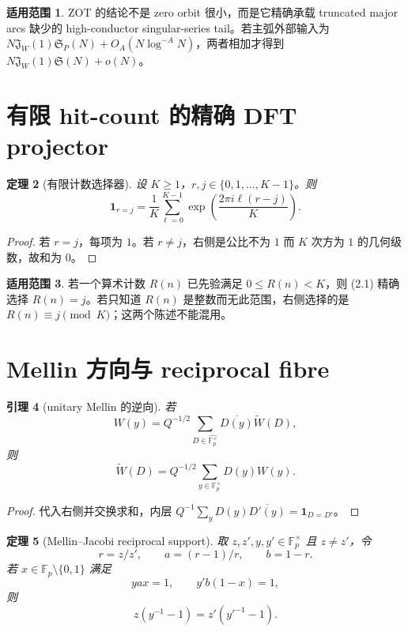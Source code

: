 \documentclass[11pt,a4paper]{ctexart}
\newtheorem{theorem}{定理}[section]
\newtheorem{lemma}[theorem]{引理}
\theoremstyle{definition}
\newtheorem{remark}[theorem]{适用范围}
\newcommand{\F}{\mathbb F}
\newcommand{\G}{\F_p^\times}
\newcommand{\Gh}{\widehat{\G}}
\newcommand{\1}{\mathbf 1}
\begin{document}
\begin{remark}
ZOT 的结论不是 zero orbit 很小，而是它精确承载 truncated major arcs 缺少的
high-conductor singular-series tail。若主弧外部输入为
$N\mathfrak J_W(1)\mathfrak S_P(N)+O_A(N\log^{-A}N)$，两者相加才得到
$N\mathfrak J_W(1)\mathfrak S(N)+o(N)$。
\end{remark}

\section{有限 hit-count 的精确 DFT projector}

\begin{theorem}[有限计数选择器]
设 $K\ge1$，$r,j\in\{0,1,\ldots,K-1\}$。则
\[
\boxed{
\1_{r=j}=\frac1K\sum_{\ell=0}^{K-1}
\exp\!\left(\frac{2\pi i\ell(r-j)}K\right).}
\tag{2.1}
\]
\end{theorem}

\begin{proof}
若 $r=j$，每项为 $1$。若 $r\ne j$，右侧是公比不为 $1$ 而 $K$ 次方为
$1$ 的几何级数，故和为 $0$。
\end{proof}

\begin{remark}
若一个算术计数 $R(n)$ 已先验满足 $0\le R(n)<K$，则 (2.1) 精确选择
$R(n)=j$。若只知道 $R(n)$ 是整数而无此范围，右侧选择的是
$R(n)\equiv j\pmod K$；这两个陈述不能混用。
\end{remark}

\section{Mellin 方向与 reciprocal fibre}

\begin{lemma}[unitary Mellin 的逆向]
若
\[
W(y)=Q^{-1/2}\sum_{D\in\Gh}\overline{D(y)}\widetilde W(D),
\]
则
\[
\boxed{\widetilde W(D)=Q^{-1/2}\sum_{y\in\G}D(y)W(y).}
\tag{3.1}
\]
\end{lemma}

\begin{proof}
代入右侧并交换求和，内层
$Q^{-1}\sum_y D(y)\overline{D'(y)}=\1_{D=D'}$。
\end{proof}

\begin{theorem}[Mellin--Jacobi reciprocal support]
取 $z,z',y,y'\in\G$ 且 $z\ne z'$，令
\[
r=z/z',\qquad a=(r-1)/r,\qquad b=1-r.
\]
若 $x\in\F_p\setminus\{0,1\}$ 满足
\[
yax=1,\qquad y'b(1-x)=1,
\tag{3.2}
\]
则
\[
\boxed{z(y^{-1}-1)=z'(y'^{-1}-1).}
\tag{3.3}
\]
\end{theorem}
\end{document}
